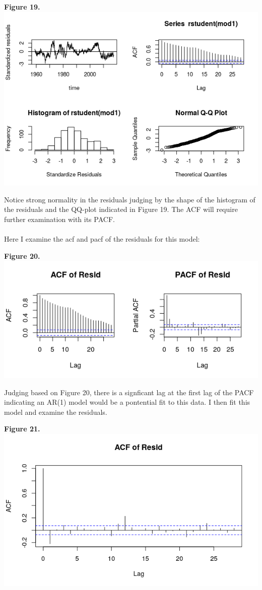 \documentclass[11pt]{article}
\begin{document}
\begin{center}
\textbf{Figure 19.}
\\
\includegraphics[scale=1]{diag}
\end{center}
Notice strong normality in the residuals judging by the shape of the histogram of the residuals and the QQ-plot indicated in Figure 19. The ACF will require further examination with its PACF.
\\\\
Here I examine the acf and pacf of the residuals for this model:
\begin{center}
\textbf{Figure 20.}
\\
\includegraphics[scale=1]{aP}
\end{center}
Judging based on Figure 20, there is a signficant lag at the first lag of the PACF indicating an AR(1) model would be a pontential fit to this data. I then fit this model and examine the residuals.
\begin{center}
\textbf{Figure 21.}
\\
\includegraphics[scale=1]{ar1}
\end{center}
\end{document}
